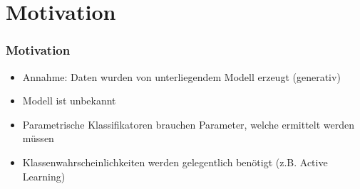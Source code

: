 \section{Motivation}

\begin{frame}
	\frametitle{Motivation}
	\begin{itemize}
		\item Annahme: Daten wurden von unterliegendem Modell erzeugt (generativ)
		\item Modell ist unbekannt
		\item Parametrische Klassifikatoren brauchen Parameter, welche ermittelt werden m\"ussen
		\item Klassenwahrscheinlichkeiten werden gelegentlich ben\"otigt (z.B. Active Learning)
	\end{itemize}
\end{frame}
